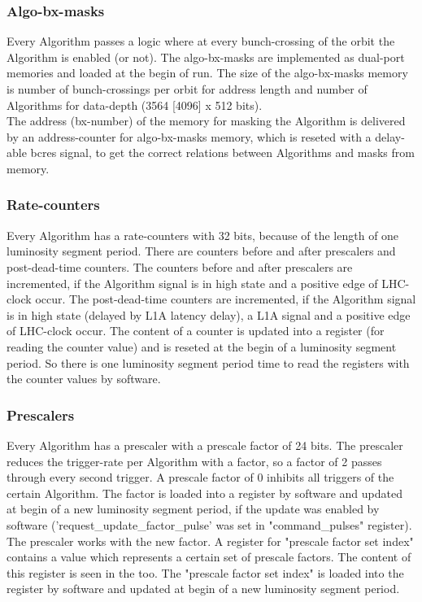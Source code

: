 \clearpage

\subsubsection{Algo-bx-masks}
\label{sec:fdl:algo_bx_masks}

Every Algorithm passes a logic where at every bunch-crossing of the orbit the Algorithm is enabled (or not). The algo-bx-masks are implemented as dual-port memories
and loaded at the begin of run.
The size of the algo-bx-masks memory is number of bunch-crossings per orbit for address length and number of Algorithms for data-depth (3564 [4096] x 512 bits).\\
The address (bx-number) of the memory for masking the Algorithm is delivered by an address-counter for algo-bx-masks memory,
which is reseted with a delay-able bcres signal, to get the correct relations between Algorithms and masks from memory.

\subsubsection{Rate-counters}
\label{sec:fdl:rate_counters}

Every Algorithm has a rate-counters with 32 bits, because of the length of one luminosity segment period. There are counters before and after prescalers and post-dead-time counters.
The counters before and after prescalers are incremented, if the Algorithm signal is in high state and a positive edge of LHC-clock occur. The post-dead-time counters are incremented,
if the Algorithm signal is in high state (delayed by L1A latency delay), a L1A signal and a positive edge of LHC-clock occur.
The content of a counter is updated into a register (for reading the counter value) and is reseted at the begin of a luminosity segment period.
So there is one luminosity segment period time to read the registers with the counter values by software.

\subsubsection{Prescalers}
\label{sec:fdl:pre_scalers}

Every Algorithm has a prescaler with a prescale factor of 24 bits. The prescaler reduces the trigger-rate per Algorithm with a factor, so \eg a factor of 2
passes through every second trigger. A prescale factor of 0 inhibits all triggers of the certain Algorithm. The factor is loaded into a register by software and updated at begin
of a new luminosity segment period, if the update was enabled by software ('request\_update\_factor\_pulse' was set in "command\_pulses" register). The prescaler works with the new factor.
A register for "prescale factor set index" contains a value which represents a certain set of
prescale factors. The content of this register is seen in the \record too. The "prescale factor set index" is loaded into the register by software and updated at begin
of a new luminosity segment period.

